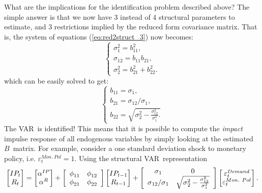 \documentclass[10pt]{article}
\begin{document}
What are the implications for the identification problem described above?
The simple answer is that we now have 3 instead of 4 structural parameters
to estimate, and 3 restrictions implied by the reduced form covariance
matrix. That is, the system of equations (\ref{eq:red2struct_3}) now becomes:%
\begin{equation}
\left\{ 
\begin{array}{l}
\sigma _{1}^{2}=b_{11}^{2}, \\ 
\sigma _{12}=b_{11}b_{21}, \\ 
\sigma _{2}^{2}=b_{21}^{2}+b_{22}^{2}.%
\end{array}%
\right.  \label{eq:red2struct_4}
\end{equation}%
which can be easily solved to get:%
\begin{equation*}
\left\{ 
\begin{array}{c}
b_{11}=\sigma _{1}, \\ 
b_{21}=\sigma _{12}/\sigma _{1}, \\ 
b_{22}=\sqrt{\sigma _{2}^{2}-\frac{\sigma _{12}^{2}}{\sigma _{1}^{2}}.}%
\end{array}%
\right.
\end{equation*}%
The VAR\ is identified! This means that it is possible to compute the \emph{%
impact} impulse response of all endogenous variables by simply looking at
the estimated $B$\ matrix. For example, consider a one standard deviation
shock to monetary policy, i.e. $\varepsilon _{t}^{Mon.\ Pol}=1$. Using the
structural VAR\ representation 
\begin{equation*}
\begin{bmatrix}
IP_{t} \\ 
R_{t}%
\end{bmatrix}%
=%
\begin{bmatrix}
\alpha ^{IP} \\ 
\alpha ^{R}%
\end{bmatrix}%
+\left[ 
\begin{array}{cc}
\phi _{11} & \phi _{12} \\ 
\phi _{21} & \phi _{22}%
\end{array}%
\right] 
\begin{bmatrix}
IP_{t-1} \\ 
R_{t-1}%
\end{bmatrix}%
+\left[ 
\begin{array}{cc}
\sigma _{1} & 0 \\ 
\sigma _{12}/\sigma _{1} & \sqrt{\sigma _{2}^{2}-\frac{\sigma _{12}^{2}}{%
\sigma _{1}^{2}}}%
\end{array}%
\right] 
\begin{bmatrix}
\varepsilon _{t}^{Demand} \\ 
\varepsilon _{t}^{Mon.\ Pol}%
\end{bmatrix}%
.
\end{equation*}%
\end{document}
